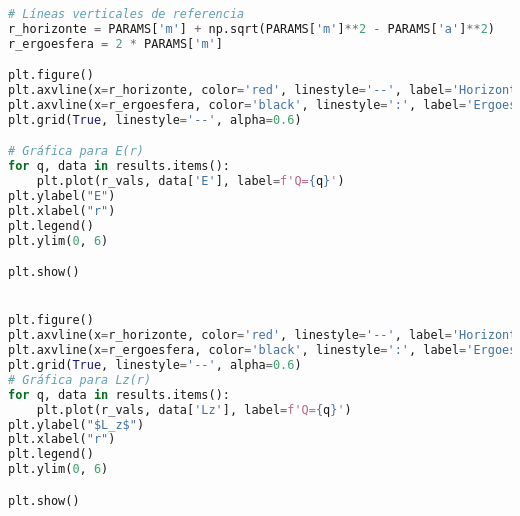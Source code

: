 \begin{lstlisting}[language=Python, caption={Cálculo numérico de las constantes para órbitas circulares en Kerr}, label={lst:kerr_circular_orbits}]
# Líneas verticales de referencia
r_horizonte = PARAMS['m'] + np.sqrt(PARAMS['m']**2 - PARAMS['a']**2)
r_ergoesfera = 2 * PARAMS['m']

plt.figure()
plt.axvline(x=r_horizonte, color='red', linestyle='--', label='Horizonte de eventos ($r_+$)')
plt.axvline(x=r_ergoesfera, color='black', linestyle=':', label='Ergoesfera estática ($r_E$)')
plt.grid(True, linestyle='--', alpha=0.6)

# Gráfica para E(r)
for q, data in results.items():
    plt.plot(r_vals, data['E'], label=f'Q={q}')
plt.ylabel("E")
plt.xlabel("r")
plt.legend()
plt.ylim(0, 6)

plt.show()


plt.figure()
plt.axvline(x=r_horizonte, color='red', linestyle='--', label='Horizonte de eventos ($r_+$)')
plt.axvline(x=r_ergoesfera, color='black', linestyle=':', label='Ergoesfera estática ($r_E$)')
plt.grid(True, linestyle='--', alpha=0.6)   
# Gráfica para Lz(r)
for q, data in results.items():
    plt.plot(r_vals, data['Lz'], label=f'Q={q}')
plt.ylabel("$L_z$")
plt.xlabel("r")
plt.legend()
plt.ylim(0, 6)

plt.show()
\end{lstlisting}